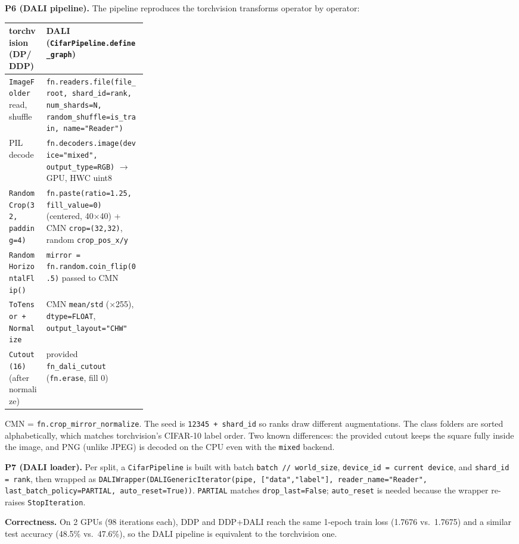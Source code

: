 \documentclass[11pt,a4paper]{article}
\begin{document}
\textbf{P6 (DALI pipeline).} The pipeline reproduces the torchvision transforms operator by operator:
\begin{center}\footnotesize
\begin{tabularx}{\linewidth}{@{}>{\raggedright\arraybackslash}p{0.27\linewidth}>{\raggedright\arraybackslash}X@{}}
\toprule
torchvision (DP/DDP) & DALI (\texttt{CifarPipeline.define\_graph}) \\
\midrule
\texttt{ImageFolder} read, shuffle & \texttt{fn.readers.file(file\_root, shard\_id=rank, num\_shards=N,} \texttt{random\_shuffle=is\_train, name="Reader")} \\
PIL decode & \texttt{fn.decoders.image(device="mixed", output\_type=RGB)} $\rightarrow$ GPU, HWC uint8 \\
\texttt{RandomCrop(32, padding=4)} & \texttt{fn.paste(ratio=1.25, fill\_value=0)} (centered, 40$\times$40) + CMN \texttt{crop=(32,32)}, random \texttt{crop\_pos\_x/y} \\
\texttt{RandomHorizontalFlip()} & \texttt{mirror = fn.random.coin\_flip(0.5)} passed to CMN \\
\texttt{ToTensor + Normalize} & CMN \texttt{mean/std} ($\times$255), \texttt{dtype=FLOAT}, \texttt{output\_layout="CHW"} \\
\texttt{Cutout(16)} (after normalize) & provided \texttt{fn\_dali\_cutout} (\texttt{fn.erase}, fill 0) \\
\bottomrule
\end{tabularx}
\end{center}
CMN = \texttt{fn.crop\_mirror\_normalize}. The seed is \texttt{12345 + shard\_id} so ranks draw different augmentations. The class
folders are sorted alphabetically, which matches torchvision's CIFAR-10 label order. Two known differences: the provided cutout keeps the
square fully inside the image, and PNG (unlike JPEG) is decoded on the CPU even with the \texttt{mixed} backend.

\textbf{P7 (DALI loader).} Per split, a \texttt{CifarPipeline} is built with batch \texttt{batch // world\_size}, \texttt{device\_id = current device}, and
\texttt{shard\_id = rank}, then wrapped as \texttt{DALIWrapper(DALIGenericIterator(pipe, ["data","label"], reader\_name="Reader",
last\_batch\_policy=PARTIAL, auto\_reset=True))}. \texttt{PARTIAL} matches \texttt{drop\_last=False}; \texttt{auto\_reset} is needed because the
wrapper re-raises \texttt{StopIteration}.

\textbf{Correctness.} On 2 GPUs (98 iterations each), DDP and DDP+DALI reach the same 1-epoch train loss (1.7676 vs.\ 1.7675) and a similar test
accuracy (48.5\% vs.\ 47.6\%), so the DALI pipeline is equivalent to the torchvision one.
\end{document}
